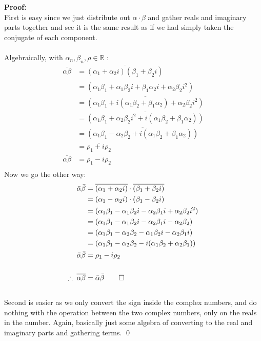 \begin{enumerate}
	\textbf{Proof:} \\
	First is easy since we just distribute out $\alpha\cdot\beta$ and gather reals and imaginary parts together and see it is the same result as if we had simply taken the conjugate of each component.\\
	\\ 
	Algebraically, with $\alpha_n, \beta_n, \rho \in \mathbb{R}$ :
	\begin{align*}
		\overline{\alpha \beta} &= \overline{(\alpha_1 + \alpha_2 i)(\beta_1 + \beta_2 i)} \\
		&= \overline{(\alpha_1\beta_1  + \alpha_1\beta_2 i + \beta_1 \alpha_2 i + \alpha_2 \beta_2 i^2)} \\
		&= \overline{(\alpha_1\beta_1  + i(\alpha_1\beta_2 + \beta_1 \alpha_2) + \alpha_2 \beta_2 i^2)} \\
		&= \overline{(\alpha_1\beta_1 + \alpha_2 \beta_2 i^2 + i(\alpha_1\beta_2 + \beta_1 \alpha_2))} \\
		&= \overline{(\alpha_1\beta_1 - \alpha_2 \beta_2 + i(\alpha_1\beta_2 + \beta_1 \alpha_2))} \\
		&= \overline{\rho_1  + i\rho_2} \\
		\overline{\alpha \beta} &= \rho_1  - i\rho_2 \\
	\end{align*}
	Now we go the other way:
	\begin{align*}
		\bar{\alpha}\bar{\beta} &= \overline{(\alpha_1 + \alpha_2 i)} \cdot \overline{(\beta_1 + \beta_2 i)} \\
		&= (\alpha_1 - \alpha_2 i) \cdot (\beta_1 - \beta_2 i) \\
		&= (\alpha_1\beta_1 - \alpha_1\beta_2i -\alpha_2\beta_1 i + \alpha_2\beta_2 i^2 ) \\
		&= (\alpha_1\beta_1 - \alpha_1\beta_2i -\alpha_2\beta_1 i - \alpha_2\beta_2 ) \\
		&= (\alpha_1\beta_1 - \alpha_2\beta_2 - \alpha_1\beta_2i -\alpha_2\beta_1 i ) \\
		&= (\alpha_1\beta_1 - \alpha_2\beta_2 - i(\alpha_1\beta_2 + \alpha_2\beta_1) ) \\
		\bar{\alpha}\bar{\beta} &= \rho_1 - i\rho_2 \\
		\\
		\therefore \;  \overline{\alpha\beta} &= \bar{\alpha}\bar{\beta}
		\qed
	\end{align*}
	\\
	Second is easier as we only convert the sign inside the complex numbers, and do nothing with the operation between the two complex numbers, only on the reals in the number. Again, basically just some algebra of converting to the real and imaginary parts and gathering terms. 
	\qed
	

\end{enumerate}
